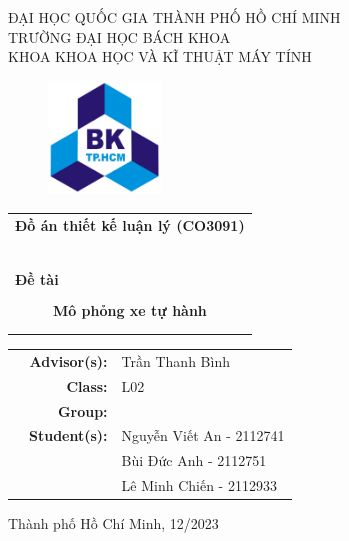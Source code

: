 \documentclass[a4paper, 13pt]{article}
\begin{document}
\begin{titlepage}
\begin{center}
ĐẠI HỌC QUỐC GIA THÀNH PHỐ HỒ CHÍ MINH \\
TRƯỜNG ĐẠI HỌC BÁCH KHOA \\
KHOA KHOA HỌC VÀ KĨ THUẬT MÁY TÍNH
\end{center}

\vspace{1cm}

\begin{figure}[h!]
\begin{center}
\includegraphics[width=3cm]{images/logo-BK.png}
\end{center}
\end{figure}

\vspace{1cm}


\begin{center}
\begin{tabular}{c}
\multicolumn{1}{l}{\textbf{{\Large Đồ án thiết kế luận lý (CO3091)}}}\\
~~\\
\hline
\\
\multicolumn{1}{l}{\textbf{{\Large Đề tài}}}\\
\\
\textbf{{\Huge Mô phỏng xe tự hành}}\\
\\
\\
\hline
\end{tabular}
\end{center}

\vspace{2cm}

\begin{table}[h]
\begin{tabular}{rrl}
\hspace{4 cm} & \textbf{Advisor(s):} & Trần Thanh Bình\\

& \textbf{Class:} &L02\\
& \textbf{Group:} &\\
& \textbf{Student(s):} &Nguyễn Viết An -  2112741\\
& & Bùi Đức Anh - 2112751\\
& & Lê Minh Chiến - 2112933\\
\end{tabular}
\end{table}

\begin{center}
{\footnotesize Thành phố Hồ Chí Minh, 12/2023}
\end{center}
\end{titlepage}
\end{document}
